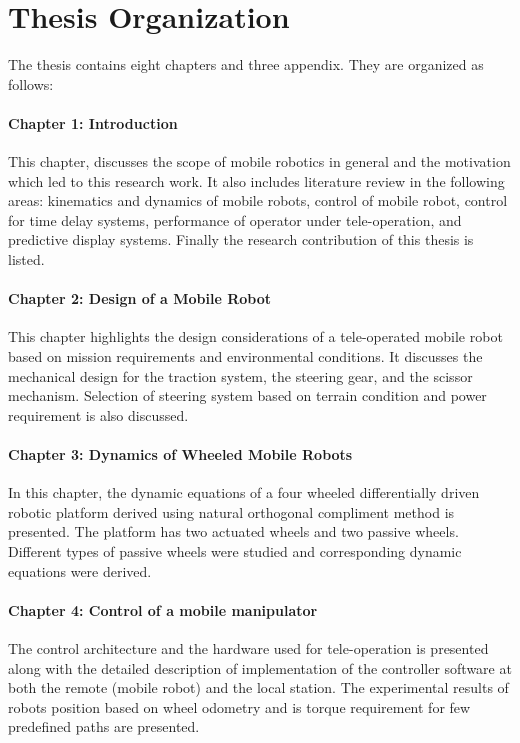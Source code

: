 \section{Thesis Organization}
The thesis contains eight chapters and three appendix. They are organized as follows:
\paragraph*{Chapter 1: Introduction\\}
This  chapter, discusses the scope of mobile robotics in general and the motivation which led to this research work. It also includes literature review in the following areas: kinematics and dynamics of mobile robots, control of mobile robot, control for time delay systems, performance of operator under tele-operation,  and predictive display systems. Finally the research contribution of this thesis is listed. 


\paragraph*{Chapter 2: Design of a Mobile Robot\\}
This chapter highlights the design considerations of a tele-operated mobile robot based on mission requirements and  environmental conditions.  It  discusses the mechanical design for the traction system, the steering gear, and the scissor mechanism. Selection of  steering system based on terrain condition and power requirement is also discussed.   
\paragraph*{Chapter 3: Dynamics of Wheeled Mobile Robots \\}
In this chapter, the dynamic equations of a four wheeled differentially driven robotic platform derived using natural orthogonal compliment method is presented. The platform has two actuated wheels and two passive wheels. Different types of passive wheels were studied and  corresponding dynamic equations were derived. 
\paragraph*{Chapter 4: Control of a mobile manipulator \\}
The control architecture and the hardware used for tele-operation is presented along with the detailed description of implementation of the controller software at both the remote (mobile robot)  and the local station. The experimental results of robots position based on wheel odometry and is torque requirement for few predefined paths are presented. 

